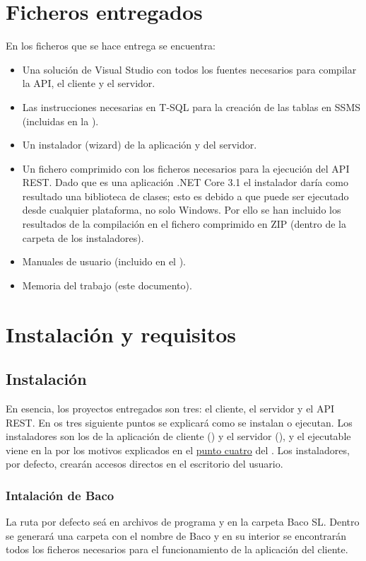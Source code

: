 \documentclass[12pt, a4paper]{book} %
\begin{document}
	\chapter{Ficheros entregados} \label{ch:files}
	En los ficheros que se hace entrega se encuentra:
	\begin{itemize}
		\item Una solución de Visual Studio con todos los fuentes necesarios para compilar la API, el cliente y el servidor.
		\item Las instrucciones necesarias en T-SQL para la creación de las tablas en SSMS (incluidas en la ).
		\item Un instalador (wizard) de la aplicación y del servidor.
		\item \hypertarget{netcoredll}{Un fichero comprimido con los ficheros necesarios para la ejecución del API REST. Dado que es una aplicación .NET Core 3.1 el instalador daría como resultado una biblioteca de clases; esto es debido a que puede ser ejecutado desde cualquier plataforma, no solo Windows. Por ello se han incluido los resultados de la compilación en el fichero comprimido en ZIP (dentro de la carpeta de los instaladores).}
		\item Manuales de usuario (incluido en el ).
		\item Memoria del trabajo (este documento).
	\end{itemize}
	\chapter{Instalación y requisitos}
		\section{Instalación}
		En esencia, los proyectos entregados son tres: el cliente, el servidor y el API REST. En os tres siguiente puntos se explicará como se instalan o ejecutan. Los instaladores son los de la aplicación de cliente () y el servidor (), y el ejecutable viene en la  por los motivos explicados en el \hyperlink{netcoredll}{punto cuatro} del . Los instaladores, por defecto, crearán accesos directos en el escritorio del usuario.
			\subsection{Intalación de Baco} \label{sbc:clientinstaller}
			La ruta por defecto seá en archivos de programa y en la carpeta Baco SL. Dentro se generará una carpeta con el nombre de Baco y en su interior se encontrarán todos los ficheros necesarios para el funcionamiento de la aplicación del cliente.
\end{document}

